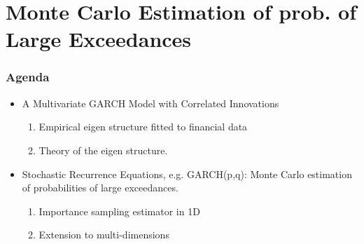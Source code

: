 \documentclass{beamer}
\begin{document}
\section{Monte Carlo Estimation of prob. of Large Exceedances}

\begin{frame}
  \frametitle{Agenda}
  \begin{itemize}
    \item \textcolor[HTML]{AAAAAA}{A Multivariate GARCH Model with Correlated Innovations}
      \begin{enumerate}
      \item \textcolor[HTML]{AAAAAA}{Empirical eigen structure fitted to financial data}
      \item \textcolor[HTML]{AAAAAA}{Theory of the eigen structure.}
      \end{enumerate}
  \item Stochastic Recurrence Equations, e.g. GARCH(p,q): Monte Carlo
    estimation of probabilities of large exceedances.
    \begin{enumerate}
    \item Importance sampling estimator in 1D
    \item Extension to multi-dimensions
    \end{enumerate}
  \end{itemize}
\end{frame}
\end{document}
